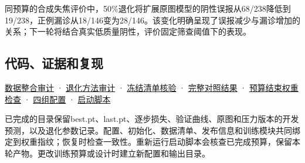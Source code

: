\documentclass[
  10pt,
]{article}
\begin{document}
同预算的合成失焦评价中，50\%退化将扩展原图模型的阴性误报从68/238降低到19/238，正例漏诊从18/146变为28/146。该变化明确呈现了误报减少与漏诊增加的关系；下一轮将结合真实低质量阴性，评价固定筛查阈值下的表现。

\subsection{代码、证据和复现}\label{ux4ee3ux7801ux8bc1ux636eux548cux590dux73b0}

\href{data-audit.zh.md}{数据整合审计} ·
\href{degradation-audit.zh.md}{退化方法审计} ·
\href{../../../../data/prepared/expanded_20261113/cohort_verification.json}{冻结清单核验}
·
\href{../../../../runs/expanded_20261113/comparison.json}{完整对照结果}
·
\href{../../../../runs/expanded_20261113/budget_end_comparison.json}{预算结束权重检查}
· \href{../../../../configs/expanded_20261113/}{四组配置} ·
\href{../../../../tools/start_expansion_experiments_20261113.ps1}{启动脚本}

已完成的目录保留best.pt、last.pt、逐步损失、验证曲线、原图和压力版本的开发预测，以及退化参数记录。配置、初始化、数据清单、发布信息和训练模块共同绑定到权重指纹；恢复时检查一致性。重新运行启动脚本会核查已完成预算，保留本轮产物。更改训练预算或设计时建立新配置和输出目录。
\end{document}
